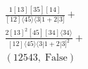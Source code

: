 \documentclass[varwidth, border=5pt]{standalone}
\begin{document}
\begin{my}
$\begin{gathered}
\scriptscriptstyle\frac{1[13][35][14]}{[12]⟨45⟩⟨3|1+2|3]}+\\
\scriptscriptstyle\frac{2[13]^2[45][34]⟨34⟩}{[12]⟨45⟩⟨3|1+2|3]^2}+\\
\scriptscriptstyle(12543,\;\text{False})\phantom{+}
\end{gathered}$
\end{my}
\end{document}
